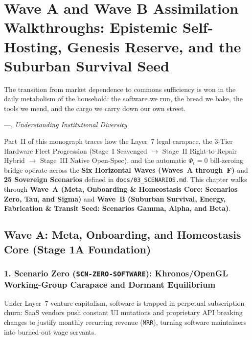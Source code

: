 \chapter{Wave A and Wave B Assimilation Walkthroughs: Epistemic Self-Hosting, Genesis Reserve, and the Suburban Survival Seed}
\label{ch:l7-waves-a-and-b}

\epigraph{The transition from market dependence to commons sufficiency is won in the daily metabolism of the household: the software we run, the bread we bake, the tools we mend, and the cargo we carry down our own street.}{---\textcite{ostrom2005}, \textit{Understanding Institutional Diversity}}

Part~II of this monograph traces how the Layer~7 legal carapace, the 3-Tier Hardware Fleet Progression (Stage~I Scavenged $\to$ Stage~II Right-to-Repair Hybrid $\to$ Stage~III Native Open-Spec), and the automatic $\Phi_t = 0$ bill-zeroing bridge operate across the \textbf{Six Horizontal Waves (Waves~A through~F)} and \textbf{25 Sovereign Scenarios} defined in \texttt{docs/03\_SCENARIOS.md}. This chapter walks through \textbf{Wave~A (Meta, Onboarding \& Homeostasis Core: Scenarios Zero, Tau, and Sigma)} and \textbf{Wave~B (Suburban Survival, Energy, Fabrication \& Transit Seed: Scenarios Gamma, Alpha, and Beta)}.

\section{Wave A: Meta, Onboarding, and Homeostasis Core (Stage 1A Foundation)}
\label{sec:l7-wave-a}

\subsection{1. Scenario Zero (\texttt{SCN-ZERO-SOFTWARE}): Khronos/OpenGL Working-Group Carapace and Dormant Equilibrium}
Under Layer~7 venture capitalism, software is trapped in perpetual subscription churn: SaaS vendors push constant UI mutations and proprietary API breaking changes to justify monthly recurring revenue (\texttt{MRR}), turning software maintainers into burned-out wage servants.

